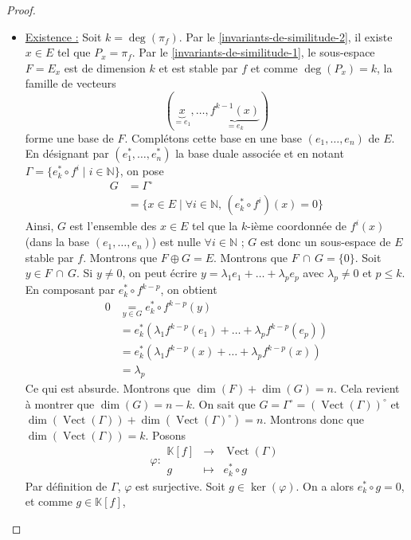 	\begin{proof}
		\begin{itemize}
			\item \uline{Existence :} Soit $k = \deg(\pi_f)$. Par le \cref{invariants-de-similitude-2}, il existe $x \in E$ tel que $P_x = \pi_f$. Par le \cref{invariants-de-similitude-1}, le sous-espace $F = E_x$ est de dimension $k$ et est stable par $f$ et comme $\deg(P_x) = k$, la famille de vecteurs
			\[ (\underbrace{x}_{= e_1}, \dots, \underbrace{f^{k-1}(x)}_{= e_k}) \]
			forme une base de $F$. Complétons cette base en une base $(e_1, \dots, e_n)$ de $E$. En désignant par $(e_1^*, \dots, e_n^*)$ la base duale associée et en notant $\Gamma = \{ e_k^* \circ f^i \mid i \in \mathbb{N} \}$, on pose
			\begin{align*}
				G &= \Gamma^\circ \\
				&= \{ x \in E \mid \forall i \in \mathbb{N}, \, (e_k^* \circ f^i)(x) = 0 \}
			\end{align*}
			Ainsi, $G$ est l'ensemble des $x \in E$ tel que la $k$-ième coordonnée de $f^i(x)$ (dans la base $(e_1, \dots, e_n)$)  est nulle $\forall i \in \mathbb{N}$ ; $G$ est donc un sous-espace de $E$ stable par $f$. Montrons que $F \oplus G = E$.
			\newpar
			Montrons que $F \, \cap \, G = \{ 0 \}$. Soit $y \in F \, \cap \, G$. Si $y \neq 0$, on peut écrire $y = \lambda_1 e_1 + \dots + \lambda_p e_p$ avec $\lambda_p \neq 0$ et $p \leq k$. En composant par $e_k^* \circ f^{k-p}$, on obtient
			\begin{align*}
				0 &\underset{y \in G}{=} e_k^* \circ f^{k-p}(y) \\
				&= e_k^* (\lambda_1 f^{k-p}(e_1) + \dots + \lambda_p f^{k-p}(e_p)) \\
				&= e_k^* (\lambda_1 f^{k-p}(x) + \dots + \lambda_p f^{k-p}(x)) \\
				&= \lambda_p
			\end{align*}
			Ce qui est absurde.
			\newpar
			Montrons que $\dim(F) + \dim(G) = n$. Cela revient à montrer que $\dim(G) = n - k$. On sait que $G = \Gamma^\circ = (\operatorname{Vect}(\Gamma))^\circ$ et $\dim(\operatorname{Vect}(\Gamma)) + \dim(\operatorname{Vect}(\Gamma)^\circ) = n$. Montrons donc que $\dim(\operatorname{Vect}(\Gamma)) = k$. Posons
			\[
			\varphi :
			\begin{array}{ccc}
				\mathbb{K}[f] &\rightarrow& \operatorname{Vect}(\Gamma) \\
				g &\mapsto& e_k^* \circ g
			\end{array}
			\]
			Par définition de $\Gamma$, $\varphi$ est surjective. Soit $g \in \ker(\varphi)$. On a alors $e_k^* \circ g = 0$, et comme $g \in \mathbb{K}[f]$,

\end{itemize}
\end{proof}
